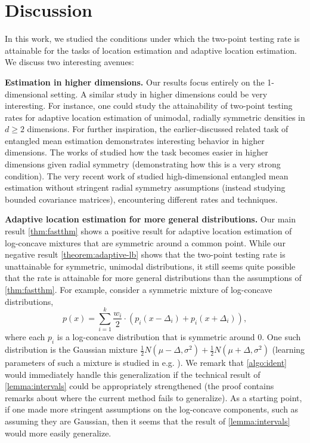 \section{Discussion}

In this work, we studied the conditions under which the two-point testing rate is attainable for the tasks of location estimation and adaptive location estimation. We discuss two interesting avenues:

\textbf{Estimation in higher dimensions. } Our results focus entirely on the 1-dimensional setting. A similar study in higher dimensions could be very interesting. For instance, one could study the attainability of two-point testing rates for adaptive location estimation of unimodal, radially symmetric densities in $d \ge 2$ dimensions. For further inspiration, the earlier-discussed related task of entangled mean estimation demonstrates interesting behavior in higher dimensions. The works of \cite{chierichetti2014learning,pensia2022estimating,compton2024near} studied how the task becomes easier in higher dimensions given  radial symmetry (demonstrating how this is a very strong condition). The very recent work of \cite{diakonikolas2025entangled} studied high-dimensional entangled mean estimation without stringent radial symmetry assumptions (instead studying bounded covariance matrices), encountering different rates and techniques.

\textbf{Adaptive location estimation for more general distributions. } Our main result \cref{thm:fastthm} shows a positive result for adaptive location estimation of log-concave mixtures that are symmetric around a common point.  While our negative result \cref{theorem:adaptive-lb} shows that the two-point testing rate is unattainable for symmetric, unimodal distributions, it still seems quite possible that the rate is attainable for more general distributions than the assumptions of \cref{thm:fastthm}. For example, consider a symmetric mixture of log-concave distributions,
\begin{equation*}
    p(x) = \sum_{i=1}^k \frac{w_i}{2} \cdot (p_i(x - \Delta_i) + p_i(x + \Delta_i)),
\end{equation*}
where each $p_i$ is a log-concave distribution that is symmetric around $0$. One such distribution is the Gaussian mixture $\frac{1}{2} N(\mu - \Delta, \sigma^2) + \frac{1}{2} N(\mu + \Delta,\sigma^2)$ (learning parameters of such a mixture is studied in e.g. \cite{wu2021randomly}). We remark that \cref{algo:ident} would immediately handle this generalization if the technical result of \cref{lemma:intervals} could be appropriately strengthened (the proof contains remarks about where the current method fails to generalize). As a starting point, if one made more stringent assumptions on the log-concave components, such as assuming they are Gaussian, then it seems that the result of \cref{lemma:intervals} would more easily generalize.

